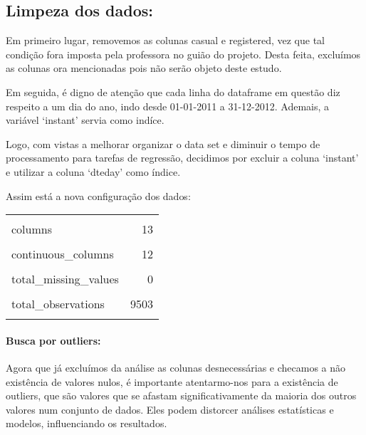 \documentclass[
  letterpaper,
  DIV=11,
  numbers=noendperiod]{scrartcl}
\let\oldparagraph\paragraph
\renewcommand{\paragraph}[1]{\oldparagraph{#1}\mbox{}}
\begin{document}
\newpage{}

\subsection{Limpeza dos dados:}\label{limpeza-dos-dados}

Em primeiro lugar, removemos as colunas casual e registered, vez que tal
condição fora imposta pela professora no guião do projeto. Desta feita,
excluímos as colunas ora mencionadas pois não serão objeto deste estudo.

Em seguida, é digno de atenção que cada linha do dataframe em questão
diz respeito a um dia do ano, indo desde 01-01-2011 a 31-12-2012.
Ademais, a variável `instant' servia como indíce.

Logo, com vistas a melhorar organizar o data set e diminuir o tempo de
processamento para tarefas de regressão, decidimos por excluir a coluna
`instant' e utilizar a coluna `dteday' como índice.

Assim está a nova configuração dos dados:

\begin{table}[!h]
\centering\begingroup\fontsize{10}{12}\selectfont

\begin{tabular}{lr}
\toprule
\cellcolor{gray!15}{rows} & \cellcolor{gray!15}{731}\\
columns & 13\\
\cellcolor{gray!15}{discrete\_columns} & \cellcolor{gray!15}{1}\\
continuous\_columns & 12\\
\cellcolor{gray!15}{all\_missing\_columns} & \cellcolor{gray!15}{0}\\
\addlinespace
total\_missing\_values & 0\\
\cellcolor{gray!15}{complete\_rows} & \cellcolor{gray!15}{731}\\
total\_observations & 9503\\
\cellcolor{gray!15}{memory\_usage} & \cellcolor{gray!15}{102928}\\
\bottomrule
\end{tabular}
\endgroup{}
\end{table}

\paragraph{Busca por outliers:}\label{busca-por-outliers}

Agora que já excluímos da análise as colunas desnecessárias e checamos a
não existência de valores nulos, é importante atentarmo-nos para a
existência de outliers, que são valores que se afastam
significativamente da maioria dos outros valores num conjunto de dados.
Eles podem distorcer análises estatísticas e modelos, influenciando os
resultados.
\end{document}
